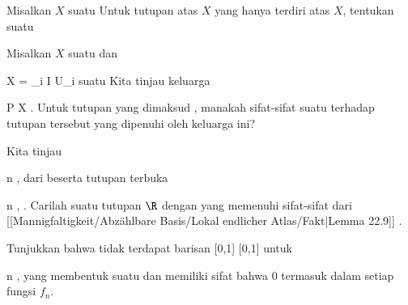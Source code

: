 {}
{

Misalkan $X$ suatu
Untuk tutupan atas $X$ yang hanya terdiri atas $X$, tentukan suatu

}
{} {}

{}
{

Misalkan $X$ suatu
dan

\mavergleichskette
{\vergleichskette
{ X
}
{ = }{ \bigcup_{i \in I} U_i
}
{  }{
}
{    }{
}
{   }{
}
}
{}{}{}
suatu
Kita tinjau keluarga

 {}
 {P \in X} {}
 {} {} {} {.}
Untuk tutupan yang dimaksud
 {}{}{,}
manakah sifat-sifat suatu
terhadap tutupan tersebut yang dipenuhi oleh keluarga ini?

}
{} {}

{}
{

Kita tinjau

 {}
 {n \in \N} {}
 {} {} {} {,} dari
beserta tutupan terbuka

 {}
 {n \in \N} {}
 {} {} {} {,}
 {} {.}
Carilah suatu tutupan $\R$ dengan
yang memenuhi sifat-sifat
dari [[Mannigfaltigkeit/Abzählbare Basis/Lokal endlicher Atlas/Fakt|Lemma 22.9]]
 {} {}.

}
{} {}

{}
{

Tunjukkan bahwa tidak terdapat barisan
 { [0,1] } { [0,1]
} {}
untuk

\mavergleichskette
{\vergleichskette
{ n
}
{ \in }{ \N
}
{  }{
}
{    }{
}
{   }{
}
}
{}{}{,}
yang membentuk suatu
dan memiliki sifat bahwa $0$ termasuk dalam
setiap fungsi $f_n$.

}
{} {}

